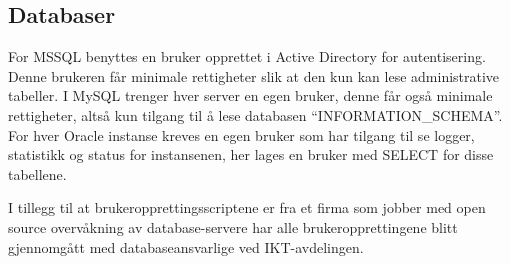 \subsection{Databaser}
For MSSQL benyttes en bruker opprettet i Active Directory for autentisering. Denne brukeren får minimale rettigheter slik at den kun kan lese administrative tabeller. I MySQL trenger hver server en egen bruker, denne får også minimale rettigheter, altså kun tilgang til å lese databasen ``INFORMATION\_SCHEMA''. For hver Oracle instanse kreves en egen bruker som har tilgang til se logger, statistikk og status for instansenen, her lages en bruker med SELECT for disse tabellene.

I tillegg til at brukeropprettingsscriptene er fra et firma som jobber med open source overvåkning av database-servere har alle brukeropprettingene blitt gjennomgått med databaseansvarlige ved IKT-avdelingen. 



